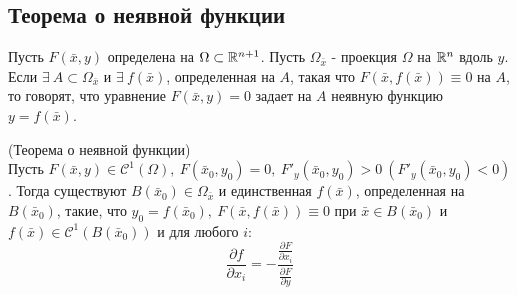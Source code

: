 \subsection{Теорема о неявной функции}
\begin{definition}%
    Пусть $F(\bar{x},y)$ определена на $\Omega\subset \mathbb{R}^{n+1}$. Пусть $\Omega_{\bar{x}}$ - проекция $\Omega$ на $\mathbb{R}^n$ вдоль $y$. Если $\exists\ A\subset \Omega_{\bar{x}}$ и $\exists\ f(\bar{x})$, определенная на $A$, такая что $F(\bar{x}, f(\bar{x}))\equiv 0$ на $A$, то говорят, что уравнение $F(\bar{x}, y)=0$ задает на $A$ неявную функцию $y=f(\bar{x})$.
\end{definition} 
\begin{theorem} (Теорема о неявной функции)\\
    Пусть $F(\bar{x},y)\in \mathcal{C}^1(\Omega),\ F(\bar{x}_0,y_0)=0,\ F'_y(\bar{x}_0,y_0)>0\ (F'_y(\bar{x}_0,y_0)<0)$. Тогда существуют $B(\bar{x}_0)\in \Omega_{\bar{x}}$ и единственная $f(\bar{x})$, определенная на $B(\bar{x}_0)$, такие, что $y_0=f(\bar{x}_0),\ F(\bar{x},f(\bar{x}))\equiv 0$ при $\bar{x}\in B(\bar{x}_0)$ и $f(\bar{x})\in \mathcal{C}^1(B(\bar{x}_0))$ и для любого $i$:
    \[\frac{\partial {f}}{\partial {x_i}}=-\frac{\frac{\partial {F}}{\partial {x_i}}}{\frac{\partial {F}}{\partial {y}}}\]
\end{theorem} 

